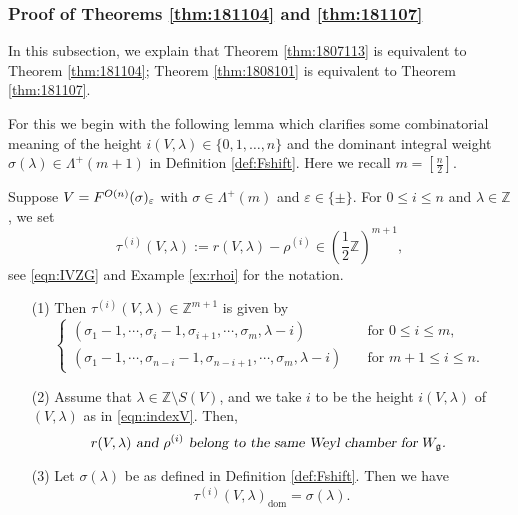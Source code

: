 \subsubsection{Proof of Theorems \ref{thm:181104} and \ref{thm:181107}}

In this subsection,
 we explain that Theorem \ref{thm:1807113}
 is equivalent to Theorem \ref{thm:181104};
 Theorem \ref{thm:1808101} is equivalent to Theorem \ref{thm:181107}.  

For this 
 we begin with the following lemma which clarifies
 some combinatorial meaning
 of the height $i(V,\lambda) \in \{0,1,\ldots,n\}$
 and the dominant integral weight $\sigma(\lambda) \in \Lambda^+(m+1)$
 in Definition \ref{def:Fshift}.  
Here we recall $m=[\frac n 2]$.  
\begin{lemma}
\label{lem:transvec}
Suppose $V=F^{{O(n)}}({\sigma})_{\varepsilon}$
 with $\sigma \in \Lambda^+(m)$
 and $\varepsilon \in \{\pm\}$.  
For $0 \le i \le n$ and $\lambda \in {\mathbb{Z}}$, 
 we set
\begin{equation}
\label{eqn:tauiVlmd}
\tau^{(i)}(V,\lambda) :=r(V,\lambda)-\rho^{(i)} \in (\frac 1 2{\mathbb{Z}})^{m+1}, 
\end{equation}
see \eqref{eqn:IVZG} and Example \ref{ex:rhoi}
 for the notation.  
\begin{enumerate}
\item[{\rm{(1)}}]
Then $\tau^{(i)}(V,\lambda) \in {\mathbb{Z}}^{m+1}$
 is given by 
\[
\begin{cases}
(\sigma_{1}-1,\cdots,\sigma_{i}-1,\sigma_{i+1},\cdots,\sigma_{m}, \lambda-i)
\quad
&\text{for $0 \le i \le m$, }
\\
(\sigma_{1}-1,\cdots,\sigma_{n-i}-1,\sigma_{n-i+1}, \cdots,\sigma_m, \lambda-i)
\quad
&\text{for $m+1 \le i \le n$.  }
\end{cases}
\]
\item[{\rm{(2)}}]
Assume that $\lambda \in {\mathbb{Z}} \setminus S(V)$, 
 and we take $i$ to be the height $i(V, \lambda)$ of $(V,\lambda)$
 as in \eqref{eqn:indexV}.  
Then, 
\[
  {\textsl{$r(V,\lambda)$ and $\rho^{(i)}$ belong to the same Weyl chamber
 for $W_{\mathfrak{g}}$.   }}
\]
\item[{\rm{(3)}}]
Let $\sigma(\lambda)$ be as defined in Definition \ref{def:Fshift}.  
Then we have
\begin{equation}
\label{eqn:tauisigma}
   \tau^{(i)}(V,\lambda)_{\operatorname{dom}}
   =
  \sigma(\lambda).  
\end{equation}
\end{enumerate}
\end{lemma}

